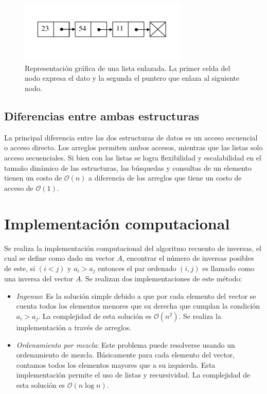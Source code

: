 \documentclass[letterpaper,11pt]{article}
\begin{document}
\begin{figure}[h!]
  \centering
  \includegraphics[width=8cm]{img/img_list.pdf}
  \caption{Representación gráfica de una lista enlazada. La primer celda del nodo expresa el dato y la segunda el puntero que enlaza al siguiente nodo.}
  \label{fig:ie}
\end{figure}



\subsection{Diferencias entre ambas estructuras}

La principal diferencia entre las dos estructuras de datos es un acceso secuencial o acceso directo. Los arreglos permiten ambos accesos, mientras que las listas solo acceso secuenciales. Si bien con las listas se logra flexibilidad y escalabilidad en el tamaño dinámico de las estructuras, las búsquedas y consultas de un elemento tienen un costo de $\mathcal{O}(n)$ a diferencia de los arreglos que tiene un costo de acceso de $\mathcal{O}(1)$.


\section{Implementación computacional}

Se realiza la implementación computacional del algoritmo recuento de inversas, el cual se define como dado un vector $A$, encontrar el número de inversas posibles de este, si $(i <j)$ y $a_i > a_j$ entonces el par ordenado $(i,j)$ es llamado como una inversa del vector $A$. Se realizan dos implementaciones de este método:

\begin{itemize}
	\item \textit{Ingenuo}: Es la solución simple debido a que por cada elemento del vector se cuenta todos los elementos menores que su derecha que cumplan la condición $a_i > a_j$. La complejidad de esta solución es $\mathcal{O}(n^2)$. Se realiza la implementación a través de arreglos.
	\item \textit{Ordenamiento por mezcla}: Este problema  puede resolverse usando un ordenamiento de mezcla. Básicamente para cada elemento del vector, contamos todos los elementos mayores que a su izquierda. Esta implementación permite el uso de listas y recursividad. La complejidad de esta solución es $\mathcal{O}(n\log n)$.
\end{itemize}
\end{document}
